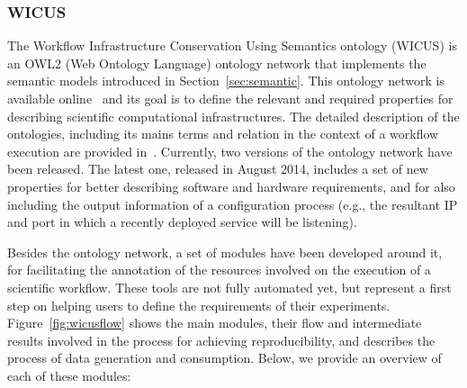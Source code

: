 \subsubsection{WICUS}

The Workflow Infrastructure Conservation Using Semantics ontology 
(WICUS) is an OWL2 (Web Ontology Language) ontology network that 
implements the semantic models introduced in Section~\ref{sec:semantic}. This ontology 
network is available online~\cite{wicus-online} and its goal is to define the relevant and 
required properties for describing scientific computational infrastructures. 
The detailed description of the ontologies, including its mains terms and relation
in the context of a workflow execution are provided in~\cite{wicus}.
Currently, two versions of the ontology network have been released. The latest one, released in
August 2014,  includes a set of new properties for better describing software and hardware requirements, and for
also including the output information of a configuration process (e.g., the resultant IP and port in 
which a recently deployed service will be listening).


Besides the ontology network, a set of modules have been developed around it, 
for facilitating the annotation of the resources involved on the execution of a scientific workflow. 
These tools are not fully automated yet, but represent a first step on helping users to define the requirements of their 
experiments. Figure~\ref{fig:wicusflow} shows the main modules, their flow and intermediate 
results involved in the process for achieving reproducibility, and describes the process of 
data generation and consumption. Below, we provide an overview of each of these modules:

